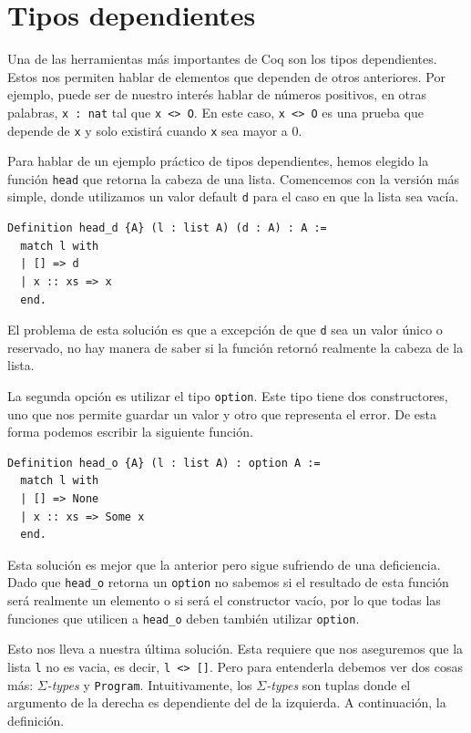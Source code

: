 \section{Tipos dependientes}

Una de las herramientas más importantes de Coq son los tipos dependientes. Estos nos permiten hablar de elementos que dependen de otros anteriores. Por ejemplo, puede ser de nuestro interés hablar de números positivos, en otras palabras, \lstinline{x : nat} tal que \lstinline{x <> O}. En este caso, \lstinline{x <> O} es una prueba que depende de \lstinline{x} y solo existirá cuando \lstinline{x} sea mayor a 0.

Para hablar de un ejemplo práctico de tipos dependientes, hemos elegido la función \lstinline{head} que retorna la cabeza de una lista. Comencemos con la versión más simple, donde utilizamos un valor default \lstinline{d} para el caso en que la lista sea vacía.

\begin{lstlisting}
Definition head_d {A} (l : list A) (d : A) : A :=
  match l with
  | [] => d
  | x :: xs => x
  end.
\end{lstlisting}

El problema de esta solución es que a excepción de que \lstinline{d} sea un valor único o reservado, no hay manera de saber si la función retornó realmente la cabeza de la lista.

La segunda opción es utilizar el tipo \lstinline{option}. Este tipo tiene dos constructores, uno que nos permite guardar un valor y otro que representa el error. De esta forma podemos escribir la siguiente función.

\begin{lstlisting}
Definition head_o {A} (l : list A) : option A :=
  match l with
  | [] => None
  | x :: xs => Some x
  end.
\end{lstlisting}

Esta solución es mejor que la anterior pero sigue sufriendo de una deficiencia. Dado que \lstinline{head_o} retorna un \lstinline{option} no sabemos si el resultado de esta función será realmente un elemento o si será el constructor vacío, por lo que todas las funciones que utilicen a \lstinline{head_o} deben también utilizar \lstinline{option}.

Esto nos lleva a nuestra última solución. Esta requiere que nos aseguremos que la lista \lstinline{l} no es vacia, es decir, \lstinline{l <> []}. Pero para entenderla debemos ver dos cosas más: $\Sigma$\textit{-types} y \lstinline{Program}.
Intuitivamente, los $\Sigma$\textit{-types} son tuplas donde el argumento de la derecha es dependiente del de la izquierda. A continuación, la definición.


